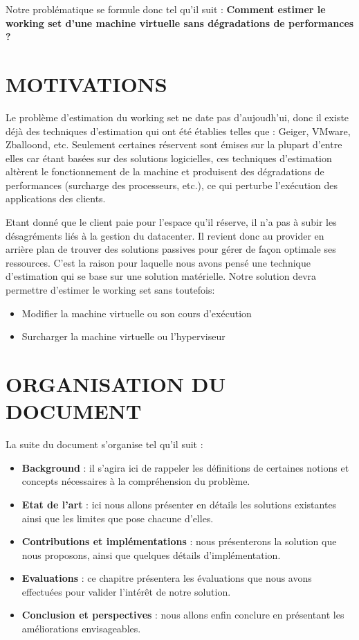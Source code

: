 Notre problématique se formule donc tel qu'il suit : \textbf{Comment estimer le working set d'une machine virtuelle sans dégradations de performances ?}

\section*{MOTIVATIONS}

Le problème d'estimation du working set ne date pas d'aujoudh'ui, donc il existe déjà des techniques d'estimation qui ont été établies telles que : Geiger, VMware, Zballoond, etc. Seulement certaines réservent sont émises sur la plupart d'entre elles car étant basées sur des solutions logicielles, ces techniques d'estimation altèrent le fonctionnement de la machine et produisent des dégradations de performances (surcharge des processeurs, etc.), ce qui perturbe l'exécution des applications des clients.
\par\noindent Etant donné que le client paie pour l'espace qu'il réserve, il n'a 
pas à subir les désagréments liés à la gestion du datacenter. Il revient donc au provider en arrière plan de trouver des solutions passives pour gérer de façon optimale ses ressources. C'est la raison pour laquelle nous avons pensé une technique d'estimation qui se base sur une solution matérielle. Notre solution devra permettre d'estimer le working set sans toutefois: 
\begin{itemize}[label=, font=\large \color{darkorange}]
    \item Modifier la machine virtuelle ou son cours d'exécution
    \item Surcharger la machine virtuelle ou l'hyperviseur
\end{itemize}

\section*{ORGANISATION DU DOCUMENT}
La suite du document s'organise tel qu'il suit : 
\begin{itemize}[label=, font=\large \color{darkorange}]
    \item \textbf{Background} : il s'agira ici de rappeler les définitions de certaines notions et concepts nécessaires à la compréhension du problème.
    \item \textbf{Etat de l'art} : ici nous allons présenter en détails les solutions existantes ainsi que les limites que pose chacune d'elles.
    \item \textbf{Contributions et implémentations} : nous présenterons la solution que nous proposons, ainsi que quelques détails d’implémentation.
    \item \textbf{Evaluations} : ce chapitre présentera les évaluations que nous avons effectuées pour valider l’intérêt de notre solution.
    \item \textbf{Conclusion et perspectives } : nous allons enfin conclure en présentant les améliorations envisageables.
\end{itemize}

